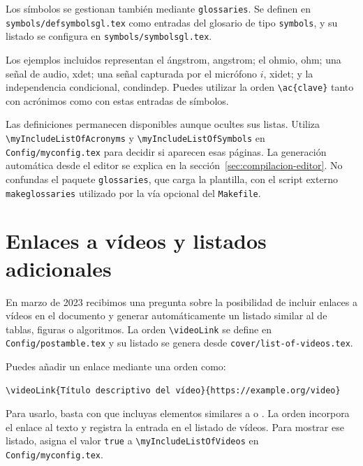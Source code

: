 Los símbolos se gestionan también mediante \texttt{glossaries}. Se definen en \texttt{symbols/defsymbolsgl.tex} como entradas del glosario de tipo \texttt{symbols}, y su listado se configura en \texttt{symbols/symbolsgl.tex}.

Los ejemplos incluidos representan el ángstrom, \ac{angstrom}; el ohmio, \ac{ohm}; una señal de audio, \ac{xdet}; una señal capturada por el micrófono \(i\), \ac{xidet}; y la independencia condicional, \ac{condindep}. Puedes utilizar la orden \texttt{\textbackslash{}ac\{clave\}} tanto con acrónimos como con estas entradas de símbolos.

Las definiciones permanecen disponibles aunque ocultes sus listas. Utiliza \texttt{\textbackslash{}myIncludeListOfAcronyms} y \texttt{\textbackslash{}myIncludeListOfSymbols} en \texttt{Config/myconfig.tex} para decidir si aparecen esas páginas. La generación automática desde el editor se explica en la sección~\ref{sec:compilacion-editor}. No confundas el paquete \texttt{glossaries}, que carga la plantilla, con el script externo \texttt{makeglossaries} utilizado por la vía opcional del \texttt{Makefile}.

\section{Enlaces a vídeos y listados adicionales}
\label{sec:intro-videolink}

En marzo de 2023 recibimos una pregunta sobre la posibilidad de incluir enlaces a vídeos en el documento y generar automáticamente un listado similar al de tablas, figuras o algoritmos. La orden \texttt{\textbackslash{}videoLink} se define en \texttt{Config/postamble.tex} y su listado se genera desde \texttt{cover/list-of-videos.tex}.

Puedes añadir un enlace mediante una orden como:

\begin{verbatim}
\videoLink{Título descriptivo del vídeo}{https://example.org/video}
\end{verbatim}

Para usarlo, basta con que incluyas elementos similares a  o . La orden incorpora el enlace al texto y registra la entrada en el listado de vídeos. Para mostrar ese listado, asigna el valor \texttt{true} a \texttt{\textbackslash{}myIncludeListOfVideos} en \texttt{Config/myconfig.tex}.

